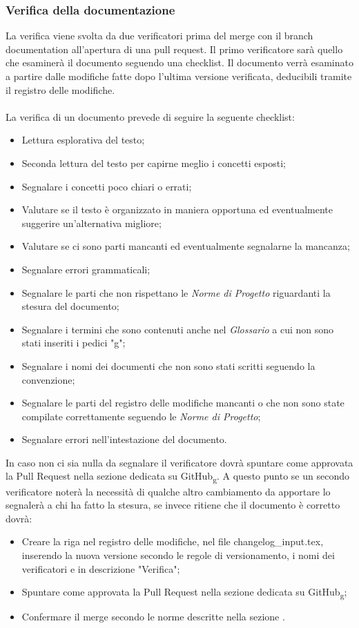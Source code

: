 \subsubsection{Verifica della documentazione}
\label{verifica_documentazione} 
La verifica viene svolta da due verificatori prima del merge con il branch documentation all'apertura di una pull request.
Il primo verificatore sarà quello che esaminerà il documento seguendo una checklist. Il documento verrà esaminato a partire dalle modifiche fatte dopo l'ultima versione verificata, 
deducibili tramite il registro delle modifiche.
\\\\
La verifica di un documento prevede di seguire la seguente checklist:
\begin{itemize}
    \item Lettura esplorativa del testo;
    \item Seconda lettura del testo per capirne meglio i concetti esposti;
    \item Segnalare i concetti poco chiari o errati;
    \item Valutare se il testo è organizzato in maniera opportuna ed eventualmente suggerire un'alternativa migliore;
    \item Valutare se ci sono parti mancanti ed eventualmente segnalarne la mancanza;
    \item Segnalare errori grammaticali;
    \item Segnalare le parti che non rispettano le \textit{Norme di Progetto} riguardanti la stesura del documento;
    \item Segnalare i termini che sono contenuti anche nel \textit{Glossario} a cui non sono stati inseriti i pedici "g";
    \item Segnalare i nomi dei documenti che non sono stati scritti seguendo la convenzione;
    \item Segnalare le parti del registro delle modifiche mancanti o che non sono state compilate correttamente seguendo le \textit{Norme di Progetto};
    \item Segnalare errori nell'intestazione del documento.
\end{itemize}
In caso non ci sia nulla da segnalare il verificatore dovrà spuntare come approvata la Pull Request nella sezione 
dedicata su GitHub\textsubscript{g}. 
A questo punto se un secondo verificatore noterà la necessità di qualche altro cambiamento da apportare lo segnalerà a 
chi ha fatto la stesura, se invece ritiene che il documento è corretto dovrà:
\begin{itemize}
    \item Creare la riga nel registro delle modifiche, nel file changelog\_input.tex, inserendo la nuova versione secondo le regole di versionamento, i nomi dei verificatori e in descrizione "Verifica";
    \item Spuntare come approvata la Pull Request nella sezione dedicata su GitHub\textsubscript{g};
    \item Confermare il merge secondo le norme descritte nella sezione .
\end{itemize}